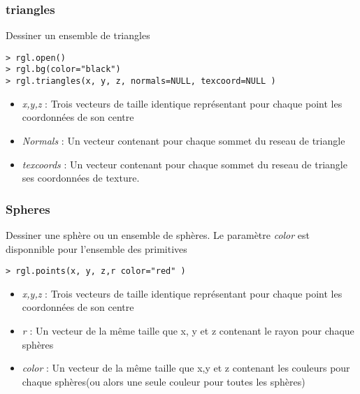 \subsubsection{triangles}

Dessiner un ensemble de triangles

\begin{lstlisting}
> rgl.open()
> rgl.bg(color="black")
> rgl.triangles(x, y, z, normals=NULL, texcoord=NULL )
\end{lstlisting}

\begin{itemize}
\item \textit{x,y,z} : Trois vecteurs de taille identique représentant pour chaque point les coordonnées de son centre
\item \textit{Normals} : Un vecteur contenant pour chaque sommet du reseau de triangle
\item \textit{texcoords} : Un vecteur contenant pour chaque sommet du reseau de triangle ses coordonnées de texture.
\end{itemize}

\subsubsection{Spheres}

Dessiner une sphère ou un ensemble de sphères. Le paramètre \textit{color} est disponnible pour l'ensemble des primitives
\begin{lstlisting}
> rgl.points(x, y, z,r color="red" )
\end{lstlisting}

\begin{itemize}
\item \textit{x,y,z} : Trois vecteurs de taille identique représentant pour chaque point les coordonnées de son centre
\item \textit{r} : Un vecteur de la même taille que x, y et z contenant le rayon pour chaque sphères 
\item \textit{color} : Un vecteur de la même taille que x,y et z contenant les couleurs pour chaque sphères(ou alors une seule couleur pour toutes les sphères)
\end{itemize}

\newpage
